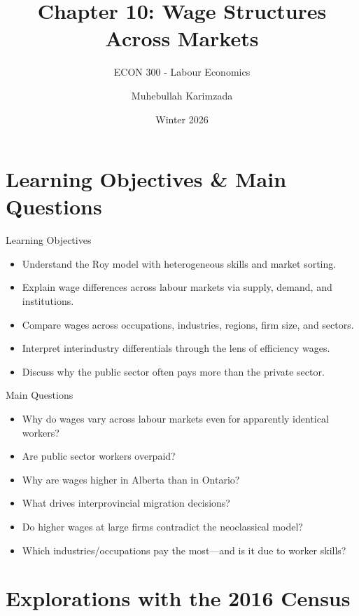\documentclass[aspectratio=169]{beamer}
\title{\textbf{Chapter 10: Wage Structures Across Markets  \vspace{.5cm}\\  }}
\subtitle{ {\large ECON 300 - Labour Economics}}
\author{Muhebullah Karimzada}
\date{Winter 2026}
\begin{document}
\begin{frame}[plain]
  \titlepage
\end{frame}

\section{Learning Objectives \& Main Questions}

\begin{frame}{Learning Objectives}
\transfade
\begin{itemize}[<+->]
  \item Understand the Roy model with heterogeneous skills and market sorting.
  \item Explain wage differences across labour markets via supply, demand, and institutions.
  \item Compare wages across occupations, industries, regions, firm size, and sectors.
  \item Interpret interindustry differentials through the lens of efficiency wages.
  \item Discuss why the public sector often pays more than the private sector.
\end{itemize}
\end{frame}

\begin{frame}{Main Questions}
\transfade
\begin{itemize}[<+->]
  \item Why do wages vary across labour markets even for apparently identical workers?
  \item Are public sector workers overpaid?
  \item Why are wages higher in Alberta than in Ontario?
  \item What drives interprovincial migration decisions?
  \item Do higher wages at large firms contradict the neoclassical model?
  \item Which industries/occupations pay the most—and is it due to worker skills?
\end{itemize}
\end{frame}

\section{Explorations with the 2016 Census}
\end{document}
